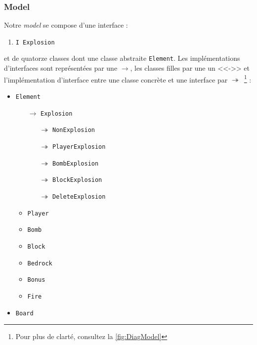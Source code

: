         \subsubsection{Model}
        Notre \textit{model} se compose d'une interface :
        \begin{enumerate}
            \item \texttt{I Explosion}
        \end{enumerate}
	    et de quatorze classes dont une classe abstraite \texttt{Element}. Les implémentations d'interfaces sont représentées par une $\rightarrow$, 
	    les classes filles par une un <<->> et l'implémentation d'interface entre
        une classe concrète et une interface par $\twoheadrightarrow$\ \footnote{Pour 
        plus de clarté, consultez la \autoref{fig:DiagModel}} :
	    \begin{multicols}{2}
        \begin{itemize}

            \item \texttt{Element}
            \begin{itemize}
            \item[$\rightarrow$] \texttt{Explosion}
				\begin{itemize}
				\item[$\twoheadrightarrow$] \texttt{NonExplosion}
				\item[$\twoheadrightarrow$] \texttt{PlayerExplosion}
				\item[$\twoheadrightarrow$]	 \texttt{BombExplosion}
				\item[$\twoheadrightarrow$]	 \texttt{BlockExplosion}
				\item[$\twoheadrightarrow$]	 \texttt{DeleteExplosion}			
							
				\end{itemize}				            
            
            
	        \item \texttt{Player}
	        \begin{itemize}
			\item[ ]
	        \end{itemize}
            \item \texttt{Bomb}
            \item \texttt{Block}
            \item \texttt{Bedrock}
            \item \texttt{Bonus}
            \item \texttt{Fire}
            \end{itemize}
            \item \texttt{Board}
        
        \end{itemize}
        \end{multicols}
        
